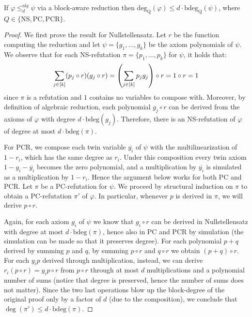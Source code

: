 \begin{proposition}
    \label{prop:alg_block_reduction}
    If $\varphi \leq^{alg}_d \psi$ via a block-aware reduction then $\mathrm{deg}_{\mathrm{Q}}(\varphi) \leq d \cdot \mathrm{bdeg}_{\mathrm{Q}}(\psi)$, where $Q \in \{\mathrm{NS}, \mathrm{PC}, \mathrm{PCR}\}$.
\end{proposition}

\begin{proof}
    We first prove the result for Nullstellensatz. Let $r$ be the function computing the reduction and let $\psi = \{g_1, \ldots, g_k\}$ be the axiom polynomials of $\psi$. We observe that for each NS-refutation $\pi = \{p_1, \ldots, p_k\}$ for $\psi$, it holds that:
    \begin{equation}
        \sum_{j \in [k]} (p_j \circ r)(g_j \circ r) = \left ( \sum_{j \in [k]} p_j g_j \right ) \circ r = 1 \circ r = 1
    \end{equation}
    since $\pi$ is a refutation and $1$ contains no variables to compose with. Moreover, by definition of algebraic reduction, each polynomial $g_j \circ r$ can be derived from the axioms of $\varphi$ with degree $d \cdot \mathrm{bdeg}(g_j)$. Therefore, there is an NS-refutation of $\varphi$ of degree at most $d \cdot \mathrm{bdeg}(\pi)$.

    For PCR, we compose each twin variable $\overline{y_i}$ of $\psi$ with the multilinearization of $1 - r_i$, which has the same degree as $r_i$. Under this composition every twin axiom $1 - y_i - \overline{y_i}$ becomes the zero polynomial, and a multiplication by $\overline{y_i}$ is simulated as a multiplication by $1 - r_i$. Hence the argument below works for both PC and PCR. Let $\pi$ be a PC-refutation for $\psi$. We proceed by structural induction on $\pi$ to obtain a PC-refutation $\pi'$ of $\varphi$. In particular, whenever $p$ is derived in $\pi$, we will derive $p \circ r$.

    Again, for each axiom $g_i$ of $\psi$ we know that $g_i \circ r$ can be derived in Nullstellensatz with degree at most $d \cdot \mathrm{bdeg}(\pi)$, hence also in PC and PCR by simulation (the simulation can be made so that it preserves degree). For each polynomial $p+q$ derived by summing $p$ and $q$, by summing $p \circ r$ and $q \circ r$ we obtain $(p+q) \circ r$. For each $y_i p$ derived through multiplication, instead, we can derive $r_i (p \circ r) = y_i p \circ r$ from $p \circ r$ through at most $d$ multiplications and a polynomial number of sums (notice that degree is preserved, hence the number of sums does not matter). Since the two last operations blow up the block-degree of the original proof only by a factor of $d$ (due to the composition), we conclude that $\deg(\pi') \leq d \cdot \mathrm{bdeg}(\pi)$.
\end{proof}

